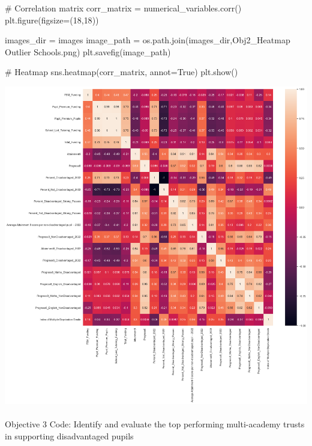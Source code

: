 \documentclass[
  letterpaper,
  DIV=11,
  numbers=noendperiod]{scrartcl}
\makeatletter
\let\oldparagraph\paragraph
\renewcommand{\paragraph}{
    \@ifstar
      \xxxParagraphStar
      \xxxParagraphNoStar
  }
\newcommand{\xxxParagraphStar}[1]{\oldparagraph*{#1}\mbox{}}
\newcommand{\xxxParagraphNoStar}[1]{\oldparagraph{#1}\mbox{}}
\newenvironment{Shaded}{\begin{snugshade}}{\end{snugshade}}
\newcommand{\CommentTok}[1]{\textcolor[rgb]{0.37,0.37,0.37}{#1}}
\newcommand{\DecValTok}[1]{\textcolor[rgb]{0.68,0.00,0.00}{#1}}
\newcommand{\NormalTok}[1]{\textcolor[rgb]{0.00,0.23,0.31}{#1}}
\newcommand{\OperatorTok}[1]{\textcolor[rgb]{0.37,0.37,0.37}{#1}}
\newcommand{\StringTok}[1]{\textcolor[rgb]{0.13,0.47,0.30}{#1}}
\newcommand{\VariableTok}[1]{\textcolor[rgb]{0.07,0.07,0.07}{#1}}
\makeatother
\begin{document}
\begin{Shaded}
\begin{Highlighting}[]

\CommentTok{\# Correlation matrix}
\NormalTok{corr\_matrix }\OperatorTok{=}\NormalTok{ numerical\_variables.corr()}
\NormalTok{plt.figure(figsize}\OperatorTok{=}\NormalTok{(}\DecValTok{18}\NormalTok{,}\DecValTok{18}\NormalTok{))}

\NormalTok{images\_dir }\OperatorTok{=} \StringTok{\textquotesingle{}images\textquotesingle{}}
\NormalTok{image\_path }\OperatorTok{=}\NormalTok{ os.path.join(images\_dir,}\StringTok{\textquotesingle{}Obj2\_Heatmap Outlier Schools.png\textquotesingle{}}\NormalTok{)}
\NormalTok{plt.savefig(image\_path)}


\CommentTok{\# Heatmap}
\NormalTok{sns.heatmap(corr\_matrix, annot}\OperatorTok{=}\VariableTok{True}\NormalTok{)}
\NormalTok{plt.show()}
\end{Highlighting}
\end{Shaded}

\includegraphics{P4DS_A2_Data_Analysis_Project_files/figure-pdf/cell-93-output-1.png}

\paragraph{Objective 3 Code: Identify and evaluate the top performing
multi-academy trusts in supporting disadvantaged
pupils}\label{objective-3-code-identify-and-evaluate-the-top-performing-multi-academy-trusts-in-supporting-disadvantaged-pupils}
\end{document}
